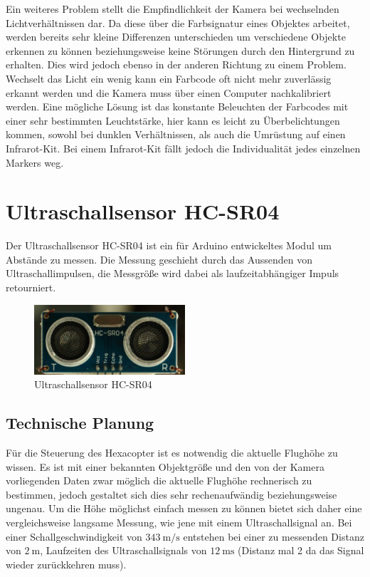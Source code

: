   Ein weiteres Problem stellt die Empfindlichkeit der Kamera bei wechselnden Lichtverhältnissen dar. Da diese über die Farbsignatur eines Objektes arbeitet, werden bereits
  sehr kleine Differenzen unterschieden um verschiedene Objekte erkennen zu können beziehungsweise keine Störungen durch den Hintergrund zu erhalten. Dies wird jedoch ebenso in der
  anderen Richtung zu einem Problem. Wechselt das Licht ein wenig kann ein Farbcode oft nicht mehr zuverlässig erkannt werden und die Kamera muss über einen Computer nachkalibriert
  werden. Eine mögliche Lösung ist das konstante Beleuchten der Farbcodes mit einer sehr bestimmten Leuchtstärke, hier kann es leicht zu Überbelichtungen kommen, sowohl bei
  dunklen Verhältnissen, als auch die Umrüstung auf einen \gls{Infrarot}-Kit. Bei einem Infrarot-Kit fällt jedoch die Individualität jedes einzelnen Markers weg.

\section{Ultraschallsensor HC-SR04}
Der Ultraschallsensor HC-SR04 ist ein für Arduino entwickeltes Modul um Abstände zu messen. Die Messung geschieht durch das Aussenden von Ultraschallimpulsen,
die Messgröße wird dabei als laufzeitabhängiger Impuls retourniert.

\begin{figure}[tbh]
  \begin{centering}
    \includegraphics[width = 0.5\textwidth]{Bilder/Ultraschallsensor}
  \par\end{centering}
  \caption{Ultraschallsensor HC-SR04}
  \label{Ultraschallsensor}
\end{figure}

  \subsection{Technische Planung}
  Für die Steuerung des Hexacopter ist es notwendig die aktuelle Flughöhe zu wissen.
  Es ist mit einer bekannten Objektgröße und den von der Kamera vorliegenden Daten zwar möglich die aktuelle Flughöhe rechnerisch zu bestimmen,
  jedoch gestaltet sich dies sehr rechenaufwändig beziehungsweise ungenau. Um die Höhe möglichst einfach messen zu können bietet sich daher eine vergleichsweise langsame Messung,
  wie jene mit einem Ultraschallsignal an.
  Bei einer Schallgeschwindigkeit von $\SI{343}{\meter\per\second}$ entstehen bei einer zu messenden Distanz von $\SI{2}{\meter}$,
  Laufzeiten des Ultraschallsignals von \ca $\SI{12}{\milli\second}$ (Distanz mal 2 da das Signal wieder zurückkehren muss).

